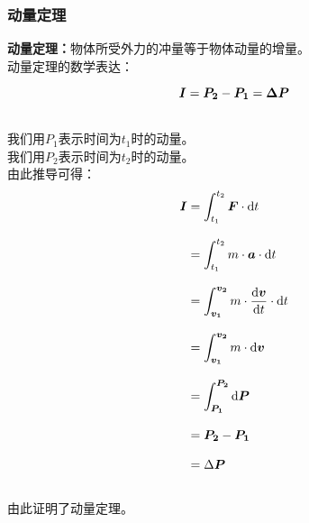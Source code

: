 \documentclass[UTF8]{ctexart}
\newcommand*{\veb}[1]{\vb*{#1}}
\newcommand*{\dif}{\mathop{}\!\mathrm{d}}
\begin{document}
\subsubsection{动量定理}
    \setcounter{equation}{0}
    \textbf{动量定理：}物体所受外力的冲量等于物体动量的增量。\\[3mm]
    动量定理的数学表达：
    \begin{large}
        \begin{equation*}
            \veb{I}=\veb{P_2}-\veb{P_1}=\veb{\Delta P}
        \end{equation*}
    \end{large}\\
    我们用$P_1$表示时间为$t_1$时的动量。\\[3mm]
    我们用$P_2$表示时间为$t_2$时的动量。\\[3mm]
    由此推导可得：
    \begin{align}
        \veb{I}
        &=\int_{t_1}^{t_2}\veb{F}\cdot\dif t\\[3mm]
        &=\int_{t_1}^{t_2}m\cdot\veb{a}\cdot\dif t\\[3mm]
        &=\int_{\veb{v_1}}^{\veb{v_2}}m\cdot\frac{\dif\veb{v}}{\dif t}\cdot\dif t\\[3mm]
        &=\int_{\veb{v_1}}^{\veb{v_2}}m\cdot\dif\veb{v}\\[3mm]
        &=\int_{\veb{P_1}}^{\veb{P_2}}\dif\veb{P}\\[3mm]
        &=\veb{P_2}-\veb{P_1}\\[3mm]
        &=\Delta\veb{P}
    \end{align}\\
    由此证明了动量定理。

\newpage
\end{document}
